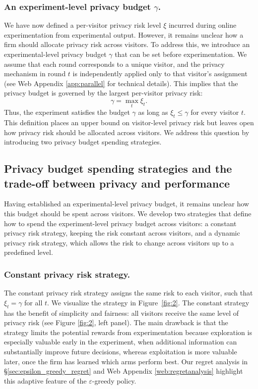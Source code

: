 \documentclass[mksc,nonblindrev]{informs3}
\begin{document}
\subsubsection{An experiment-level privacy budget $\gamma$.}\label{privacyriskexperimental}
We have now defined a per-visitor privacy risk level \(\xi\) incurred during online experimentation from experimental output. However, it remains unclear how a firm should allocate privacy risk across visitors. To address this, we introduce an experimental-level privacy budget \(\gamma\) that can be set before experimentation. We assume that each round corresponds to a unique visitor, and the privacy mechanism in round \(t\) is independently applied only to that visitor's assignment (see Web Appendix \ref{app:parallel} for technical details). This implies that the privacy budget is governed by the largest per-visitor privacy risk:
\begin{equation}\label{eq:parallel-composition}
\gamma = \max_t \xi_t.
\end{equation}
Thus, the experiment satisfies the budget $\gamma$ as long as $\xi_t\leq\gamma$ for every visitor $t$. This definition places an upper bound on visitor-level privacy risk but leaves open how privacy risk should be allocated across visitors. We address this question by introducing two privacy budget spending strategies.

\subsection{Privacy budget spending strategies and the trade-off between privacy and performance}
Having established an experimental-level privacy budget, it remains unclear how this budget should be spent across visitors. We develop two strategies that define how to spend the experiment-level privacy budget across visitors: a constant privacy risk strategy, keeping the risk constant across visitors, and a dynamic privacy risk strategy, which allows the risk to change across visitors up to a predefined level.

\subsubsection{Constant privacy risk strategy.}
The constant privacy risk strategy assigns the same risk to each visitor, such that $\xi_t=\gamma$ for all $t$. We visualize the strategy in Figure~\ref{fig:2}. The constant strategy has the benefit of simplicity and fairness: all visitors receive the same level of privacy risk (see Figure \ref{fig:2}, left panel). The main drawback is that the strategy limits the potential rewards from experimentation because exploration is especially valuable early in the experiment, when additional information can substantially improve future decisions, whereas exploitation is more valuable later, once the firm has learned which arms perform best. Our regret analysis in \S\ref{sec:epsilon_greedy_regret} and Web Appendix \ref{web:regretanalysis} highlight this adaptive feature of the $\varepsilon$-greedy policy. 
\end{document}
